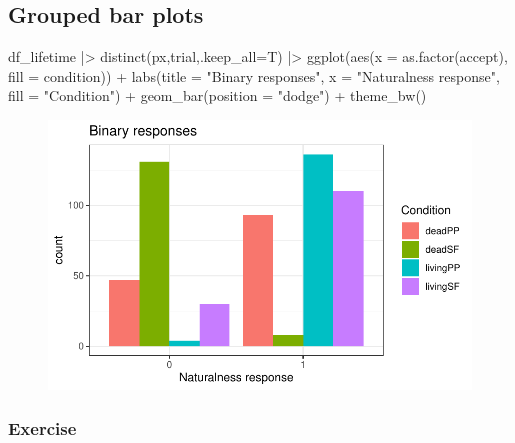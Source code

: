 \documentclass[
  letterpaper,
  DIV=11,
  numbers=noendperiod]{scrartcl}
\newenvironment{Shaded}{\begin{snugshade}}{\end{snugshade}}
\newcommand{\AttributeTok}[1]{\textcolor[rgb]{0.40,0.45,0.13}{#1}}
\newcommand{\FunctionTok}[1]{\textcolor[rgb]{0.28,0.35,0.67}{#1}}
\newcommand{\NormalTok}[1]{\textcolor[rgb]{0.00,0.23,0.31}{#1}}
\newcommand{\SpecialCharTok}[1]{\textcolor[rgb]{0.37,0.37,0.37}{#1}}
\newcommand{\StringTok}[1]{\textcolor[rgb]{0.13,0.47,0.30}{#1}}
\begin{document}
\hypertarget{grouped-bar-plots}{%
\subsection{Grouped bar plots}\label{grouped-bar-plots}}

\begin{Shaded}
\begin{Highlighting}[]
\NormalTok{df\_lifetime }\SpecialCharTok{|\textgreater{}} 
  \FunctionTok{distinct}\NormalTok{(px,trial,}\AttributeTok{.keep\_all=}\NormalTok{T) }\SpecialCharTok{|\textgreater{}} 
  \FunctionTok{ggplot}\NormalTok{(}\FunctionTok{aes}\NormalTok{(}\AttributeTok{x =} \FunctionTok{as.factor}\NormalTok{(accept), }\AttributeTok{fill =}\NormalTok{ condition)) }\SpecialCharTok{+}
  \FunctionTok{labs}\NormalTok{(}\AttributeTok{title =} \StringTok{"Binary responses"}\NormalTok{,}
       \AttributeTok{x =} \StringTok{"Naturalness response"}\NormalTok{,}
       \AttributeTok{fill =} \StringTok{"Condition"}\NormalTok{) }\SpecialCharTok{+}
  \FunctionTok{geom\_bar}\NormalTok{(}\AttributeTok{position =} \StringTok{"dodge"}\NormalTok{) }\SpecialCharTok{+}
  \FunctionTok{theme\_bw}\NormalTok{()}
\end{Highlighting}
\end{Shaded}

\begin{figure}[H]

{\centering \includegraphics{_data_viz_files/figure-pdf/unnamed-chunk-38-1.pdf}

}

\end{figure}

\hypertarget{exercise-4}{%
\subsubsection{Exercise}\label{exercise-4}}
\end{document}
